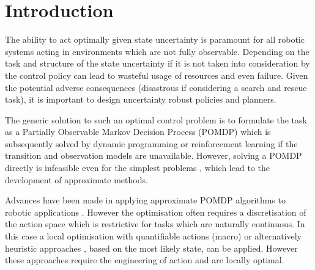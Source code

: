 \documentclass[final,5p,times,twocolumn]{elsarticle}
\begin{document}
\section{Introduction}

The ability to act optimally given state uncertainty is paramount for all robotic systems acting in 
environments which are not fully observable. Depending on the task and structure of the state
uncertainty if it is not taken into consideration by the control policy can lead to wasteful usage of resources 
and even failure. Given the potential adverse consequences (disastrous if considering a search and rescue task), 
it is important to design uncertainty robust policies and planners.

The generic solution to such an optimal control problem is to formulate the task as a
Partially Observable Markov Decision Process (POMDP) which is subsequently solved by dynamic programming
or reinforcement learning if the transition and observation models are unavailable. 
However, solving a POMDP directly is infeasible even for the simplest problems \cite{PBVI_2003}, which 
lead to the development of approximate methods. 

Advances have been made in applying approximate POMDP algorithms to robotic applications
\cite{pomdp_peg_icra_2014}. However the optimisation often requires a discretisation of the 
action space which is restrictive for tasks which are naturally continuous. In this case
a local optimisation with quantifiable actions (macro) \cite{toussain_2015} or alternatively heuristic 
approaches \cite{Lauri2016}, based on the most likely state, can be applied. However these approaches require 
the engineering of action and are locally optimal. 

\end{document}
